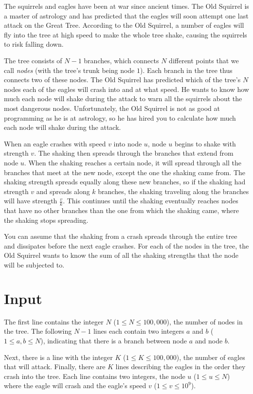 \noindent
The squirrels and eagles have been at war since ancient times.
The Old Squirrel is a master of astrology and has predicted that the eagles will soon attempt one last attack on the Great Tree.
According to the Old Squirrel, a number of eagles will fly into the tree at high speed to make the whole tree shake, causing the squirrels to risk falling down.

The tree consists of $N - 1$ branches, which connects $N$ different points that we call \emph{nodes} (with the tree's trunk being node $1$).
Each branch in the tree thus connects two of these nodes.
The Old Squirrel has predicted which of the tree's $N$ nodes each of the eagles will crash into and at what speed.
He wants to know how much each node will shake during the attack to warn all the squirrels about the most dangerous nodes.
Unfortunately, the Old Squirrel is not as good at programming as he is at astrology, so he has hired you to calculate how much each node will shake during the attack.

When an eagle crashes with speed $v$ into node $u$, node $u$ begins to shake with strength $v$.
The shaking then spreads through the branches that extend from node $u$.
When the shaking reaches a certain node, it will spread through all the branches that meet at the new node, except the one the shaking came from.
The shaking strength spreads equally along these new branches, so if the shaking had strength $v$ and spreads along $k$ branches, the shaking traveling along the branches will have strength $\frac{v}{k}$.
This continues until the shaking eventually reaches nodes that have no other branches than the one from which the shaking came, where the shaking stops spreading.

You can assume that the shaking from a crash spreads through the entire tree and dissipates before the next eagle crashes.
For each of the nodes in the tree, the Old Squirrel wants to know the sum of all the shaking strengths that the node will be subjected to.

\section*{Input}
The first line contains the integer $N$ ($1 \le N \le 100,000$), the number of nodes in the tree.
The following $N-1$ lines each contain two integers $a$ and $b$ ($1 \le a, b \le N$), indicating that there is a branch between node $a$ and node $b$.

Next, there is a line with the integer $K$ ($1 \le K \le 100,000$), the number of eagles that will attack.
Finally, there are $K$ lines describing the eagles in the order they crash into the tree.
Each line contains two integers, the node $u$ ($1 \le u \le N$) where the eagle will crash and the eagle's speed $v$ ($1 \le v \le 10^9$).

